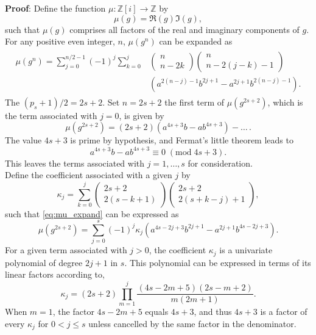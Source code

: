 \documentclass[oneside,english,man]{amsart}
\numberwithin{equation}{section}
\numberwithin{figure}{section}
\begin{document}
\textbf{Proof}: Define the function $\mu:\mathbb{Z}[i]\rightarrow\mathbb{Z}$ by 
\begin{equation} \label{eq:mu}
	\mu(g)=\Re{(g)}\Im{(g)},
\end{equation}
such that $\mu(g)$ comprises all factors of the real and imaginary components of $g$. For any positive even integer, $n$, $\mu(g^n)$ can be expanded as
\begin{align} \label{eq:mu_expand}
	\begin{split}
		\mu(g^n) = \sum_{j=0}^{n/2-1} (-1)^j \sum_{k=0}^j & \begin{pmatrix} n\\n-2k \end{pmatrix} \begin{pmatrix} n\\n-2(j-k)-1 \end{pmatrix} \\
		&\left( a^{2(n-j)-1}b^{2j+1} - a^{2j+1}b^{2(n-j)-1} \right).
	\end{split}
\end{align}
The $(p_s+1)/2=2s+2$.  Set $n=2s+2$ the first term of $\mu(g^{2s+2})$, which is the term associated with $j=0$, is given by
\begin{equation*}
	\mu(g^{2s+2})=(2s+2)\left(a^{4s+3}b-ab^{4s+3}\right)-\ldots\,.
\end{equation*}
The value $4s+3$ is prime by hypothesis, and Fermat's little theorem leads to
\begin{equation*}
	a^{4s+3}b-ab^{4s+3}\equiv 0\;(\mathrm{mod}\;4s+3).
\end{equation*}
This leaves the terms associated with $j=1,\ldots,s$ for consideration.
\\

Define the coefficient associated with a given $j$ by
\begin{equation}\label{eq:k_j}
	\kappa_j = \sum_{k=0}^j \begin{pmatrix} 2s+2\\2(s-k+1) \end{pmatrix} \begin{pmatrix} 2s+2\\2(s+k-j)+1 \end{pmatrix},
\end{equation}
such that \eqref{eq:mu_expand} can be expressed as
\begin{equation} \label{eq:m_expand}
	\mu(g^{2s+2})=\sum_{j=0}^s(-1)^j \kappa_j\left(a^{4s-2j+3}b^{2j+1}-a^{2j+1}b^{4s-2j+3}\right).
\end{equation}
For a given term associated with $j>0$, the coefficient $\kappa_j$ is a univariate polynomial of degree $2j+1$ in $s$.  This polynomial can be expressed in terms of its linear factors according to,
\begin{equation} \label{eq:k_product}
	\kappa_j = (2s+2)\prod_{m=1}^{j}\frac{(4s-2m+5)(2s-m+2)}{m(2m+1)}.
\end{equation}
When $m=1$, the factor $4s-2m+5$ equals $4s+3$, and thus $4s+3$ is a factor of every $\kappa_j$ for $0<j\leq s$ unless cancelled by the same factor in the denominator.
\\
\end{document}
